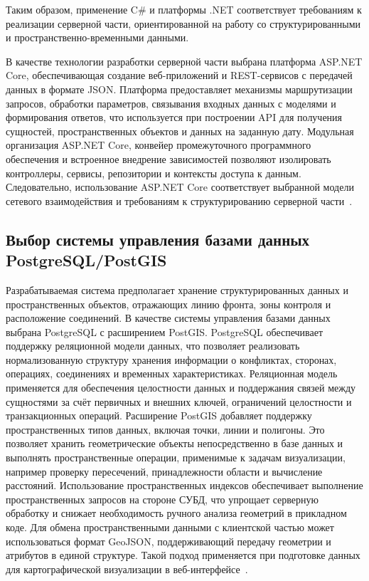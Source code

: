 Таким образом, применение C\# и платформы .NET соответствует требованиям к реализации серверной части, ориентированной на работу со структурированными и пространственно-временными данными.

В качестве технологии разработки серверной части выбрана платформа ASP.NET Core, обеспечивающая создание веб-приложений и REST-сервисов с передачей данных в формате JSON. Платформа предоставляет механизмы маршрутизации запросов, обработки параметров, связывания входных данных с моделями и формирования ответов, что используется при построении API для получения сущностей, пространственных объектов и данных на заданную дату. Модульная организация ASP.NET Core, конвейер промежуточного программного обеспечения и встроенное внедрение зависимостей позволяют изолировать контроллеры, сервисы, репозитории и контексты доступа к данным. Следовательно, использование ASP.NET Core соответствует выбранной модели сетевого взаимодействия и требованиям к структурированию серверной части~\cite{aspnet_docs}.

\subsection{Выбор системы управления базами данных PostgreSQL/PostGIS}

Разрабатываемая система предполагает хранение структурированных данных и пространственных объектов, отражающих линию фронта, зоны контроля и расположение соединений. В качестве системы управления базами данных выбрана PostgreSQL с расширением PostGIS. PostgreSQL обеспечивает поддержку реляционной модели данных, что позволяет реализовать нормализованную структуру хранения информации о конфликтах, сторонах, операциях, соединениях и временных характеристиках. Реляционная модель применяется для обеспечения целостности данных и поддержания связей между сущностями за счёт первичных и внешних ключей, ограничений целостности и транзакционных операций. Расширение PostGIS добавляет поддержку пространственных типов данных, включая точки, линии и полигоны. Это позволяет хранить геометрические объекты непосредственно в базе данных и выполнять пространственные операции, применимые к задачам визуализации, например проверку пересечений, принадлежности области и вычисление расстояний. Использование пространственных индексов обеспечивает выполнение пространственных запросов на стороне СУБД, что упрощает серверную обработку и снижает необходимость ручного анализа геометрий в прикладном коде. Для обмена пространственными данными с клиентской частью может использоваться формат GeoJSON, поддерживающий передачу геометрии и атрибутов в единой структуре. Такой подход применяется при подготовке данных для картографической визуализации в веб-интерфейсе~\cite{postgresql_docs,postgis_manual}.

